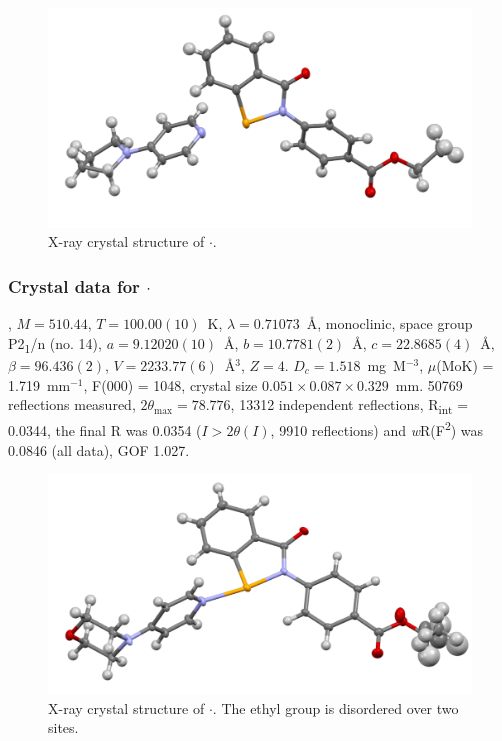 \begin{refsection}
\begin{figure}
  \includegraphics[width=0.6\linewidth]{Figures/ebs-4co2et-pyrrol-xtal.pdf}
  \caption{X-ray crystal structure of \texorpdfstring{$ \cdot $}{C25 H25 N3 O3 Se}.}
\end{figure}

\subsubsection{Crystal data for \texorpdfstring{$ \cdot $}{C25 H25 N3 O4 Se}}
, $M=510.44$, $T=100.00(10)$~K, $ \lambda=0.71073 $~\AA, monoclinic, space group P2\textsubscript{1}/n (no. 14), $a = 9.12020(10)$~\AA, $b = 10.7781(2)$~\AA, $c = 22.8685(4)$~\AA, $\beta = 96.436(2)$\degree, $V = 2233.77(6)$~\AA$^{3}$, $Z = 4$. $D_{c}= 1.518$~mg~M$^{-3}$, $\mu$(MoK\a) = 1.719~mm$^{-1}$, F(000) = 1048, crystal size $0.051 \times 0.087 \times 0.329$~mm. 50769 reflections measured, $2\theta_{\max}=78.776$\degree, 13312 independent reflections, R\textsubscript{int} = 0.0344, the final R was 0.0354 ($I > 2\theta(I)$, 9910 reflections) and \textit{w}R(F\textsuperscript{2}) was 0.0846 (all data), GOF 1.027.

\begin{figure}
  \includegraphics[width=0.6\linewidth]{Figures/ebs-4co2et-morph-xtal.pdf}
  \caption[X-ray crystal structure of \texorpdfstring{$ \cdot $}{C25 H25 N3 O4 Se}.]{X-ray crystal structure of \texorpdfstring{$ \cdot $}{C25 H25 N3 O4 Se}. The ethyl group is disordered over two sites.}
\end{figure}


\end{refsection}
